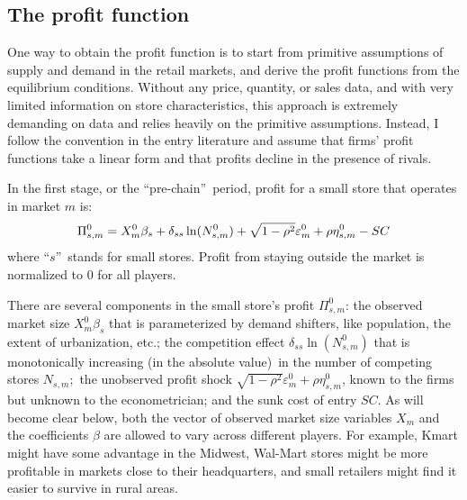 \documentclass[notitlepage,onecolumn,11pt]{article}
\begin{document}
\subsection{The profit function\label{ProfitFn}}

One way to obtain the profit function is to start from primitive assumptions
of supply and demand in the retail markets, and derive the profit functions
from the equilibrium conditions. Without any price, quantity, or sales data,
and with very limited information on store characteristics, this approach is
extremely demanding on data and relies heavily on the primitive assumptions.
Instead, I follow the convention in the entry literature and assume that
firms' profit functions take a linear form and that profits decline in the
presence of rivals.

In the first stage, or the \textquotedblleft pre-chain\textquotedblright\
period, profit for a small store that operates in market $m$ is:%
\begin{equation}
\Pi _{s,m}^{0}=X_{m}^{0}\beta _{s}+\delta _{ss}\ln (N_{s,m}^{0})+\sqrt{%
1-\rho ^{2}}\varepsilon _{m}^{0}+\rho \eta _{s,m}^{0}-SC  \label{Profit_0}
\end{equation}%
where \textquotedblleft $s$\textquotedblright\ stands for small stores.
Profit from staying outside the market is normalized to 0 for all players.

There are several components in the small store's profit $\Pi _{s,m}^{0}$:
the observed market size $X_{m}^{0}\beta _{s}$ that is parameterized by
demand shifters, like population, the extent of urbanization, etc.; the
competition effect $\delta _{ss}\ln (N_{s,m}^{0})$ that is monotonically
increasing (in the absolute value)\ in the number of competing stores $%
N_{s,m};$ the unobserved profit shock $\sqrt{1-\rho ^{2}}\varepsilon
_{m}^{0}+\rho \eta _{s,m}^{0}$, known to the firms but unknown to the
econometrician; and the sunk cost of entry $SC$. As will become clear below,
both the vector of observed market size variables $X_{m}$ and the
coefficients $\beta $ are allowed to vary across different players. For
example, Kmart might have some advantage in the Midwest, Wal-Mart stores
might be more profitable in markets close to their headquarters, and small
retailers might find it easier to survive in rural areas.
\end{document}
